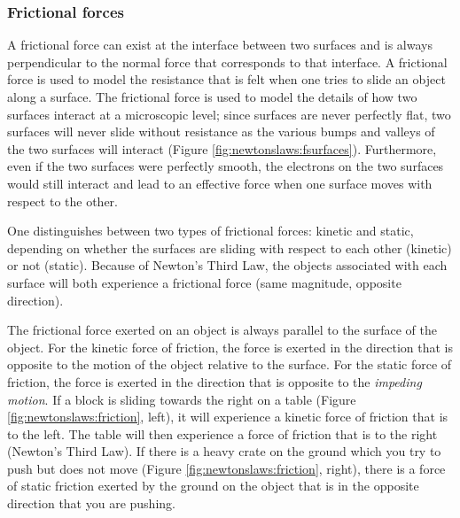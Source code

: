 \subsubsection{Frictional forces}
A frictional force can exist at the interface between two surfaces and is always perpendicular to the normal force that corresponds to that interface. A frictional force is used to model the resistance that is felt when one tries to slide an object along a surface. The frictional force is used to model the details of how two surfaces interact at a microscopic level; since surfaces are never perfectly flat, two surfaces will never slide without resistance as the various bumps and valleys of the two surfaces will interact (Figure \ref{fig:newtonslaws:fsurfaces}). Furthermore, even if the two surfaces were perfectly smooth, the electrons on the two surfaces would still interact and lead to an effective force when one surface moves with respect to the other. 


One distinguishes between two types of frictional forces: kinetic and static, depending on whether the surfaces are sliding with respect to each other (kinetic) or not (static). Because of Newton's Third Law, the objects associated with each surface will both experience a frictional force (same magnitude, opposite direction).

The frictional force exerted on an object is always parallel to the surface of the object. For the kinetic force of friction, the force is exerted in the direction that is opposite to the motion of the object relative to the surface. For the static force of friction, the force is exerted in the direction that is opposite to the \textit{impeding motion}. If a block is sliding towards the right on a table (Figure \ref{fig:newtonslaws:friction}, left), it will experience a kinetic force of friction that is to the left. The table will then experience a force of friction that is to the right (Newton's Third Law). If there is a heavy crate on the ground which you try to push but does not move (Figure \ref{fig:newtonslaws:friction}, right), there is a force of static friction exerted by the ground on the object that is in the opposite direction that you are pushing. 

